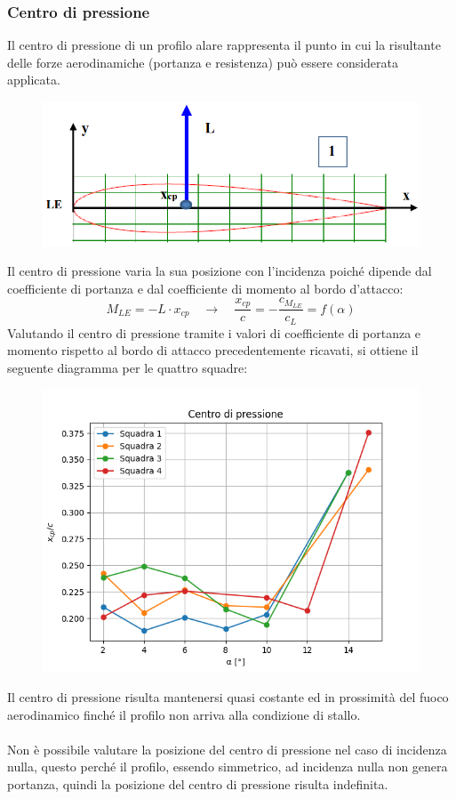 \subsubsection{Centro di pressione}
Il centro di pressione di un profilo alare rappresenta il punto in cui la risultante delle forze aerodinamiche (portanza e resistenza) può essere considerata applicata.
\begin{figure}[H]
    \centering
    \includegraphics[width=.7\textwidth]{images/5/xcpimage.png}
\end{figure}

\noindent Il centro di pressione varia la sua posizione con l'incidenza poiché dipende dal coefficiente di portanza e dal coefficiente di momento al bordo d'attacco:
\begin{equation*}
    M_{LE} = -L\cdot x_{cp} \quad \rightarrow \quad \frac{x_{cp}}c = - \frac{c_{M_{LE}}}{c_L} = f(\alpha)
\end{equation*}
Valutando il centro di pressione tramite i valori di coefficiente di portanza e momento rispetto al bordo di attacco precedentemente ricavati, si ottiene il seguente diagramma per le quattro squadre:
\begin{figure}[H]
    \centering
    \includegraphics[width=.7\textwidth]{images/5/xcp.png}
\end{figure}

\noindent Il centro di pressione risulta mantenersi quasi costante ed in prossimità del fuoco aerodinamico finché il profilo non arriva alla condizione di stallo.\\\\
Non è possibile valutare la posizione del centro di pressione nel caso di incidenza nulla, questo perché il profilo, essendo simmetrico, ad incidenza nulla non genera portanza, quindi la posizione del centro di pressione risulta indefinita.

